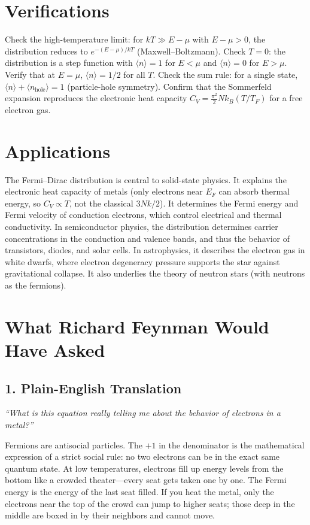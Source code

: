 \section*{Verifications}

Check the high-temperature limit: for $kT \gg E - \mu$ with $E - \mu > 0$, the distribution reduces to $e^{-(E-\mu)/kT}$ (Maxwell--Boltzmann). Check $T = 0$: the distribution is a step function with $\langle n \rangle = 1$ for $E < \mu$ and $\langle n \rangle = 0$ for $E > \mu$. Verify that at $E = \mu$, $\langle n \rangle = 1/2$ for all $T$. Check the sum rule: for a single state, $\langle n \rangle + \langle n_{\text{hole}} \rangle = 1$ (particle-hole symmetry). Confirm that the Sommerfeld expansion reproduces the electronic heat capacity $C_V = \frac{\pi^2}{2}Nk_B(T/T_F)$ for a free electron gas.
\section*{Applications}

The Fermi--Dirac distribution is central to solid-state physics. It explains the electronic heat capacity of metals (only electrons near $E_F$ can absorb thermal energy, so $C_V \propto T$, not the classical $3Nk/2$). It determines the Fermi energy and Fermi velocity of conduction electrons, which control electrical and thermal conductivity. In semiconductor physics, the distribution determines carrier concentrations in the conduction and valence bands, and thus the behavior of transistors, diodes, and solar cells. In astrophysics, it describes the electron gas in white dwarfs, where electron degeneracy pressure supports the star against gravitational collapse. It also underlies the theory of neutron stars (with neutrons as the fermions).
\section*{What Richard Feynman Would Have Asked}

\subsection*{1. Plain-English Translation}
\textit{``What is this equation really telling me about the behavior of electrons in a metal?''}

Fermions are antisocial particles. The $+1$ in the denominator is the mathematical expression of a strict social rule: no two electrons can be in the exact same quantum state. At low temperatures, electrons fill up energy levels from the bottom like a crowded theater---every seat gets taken one by one. The Fermi energy is the energy of the last seat filled. If you heat the metal, only the electrons near the top of the crowd can jump to higher seats; those deep in the middle are boxed in by their neighbors and cannot move.

